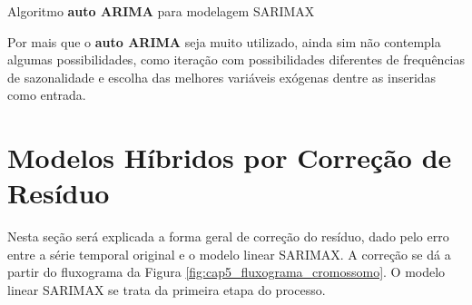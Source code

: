 \begin{algorithm}[!htbp]
    
\caption{Algoritmo \textbf{auto ARIMA} para modelagem SARIMAX \cite{hyndman2007automatic}}
\label{algo:auto_arima}
\end{algorithm}

Por mais que o \textbf{auto ARIMA} seja muito utilizado, ainda sim não contempla algumas possibilidades, como iteração com possibilidades diferentes de frequências de sazonalidade e escolha das melhores variáveis exógenas dentre as inseridas como entrada.

\section{Modelos Híbridos por Correção de Resíduo}

Nesta seção será explicada a forma geral de correção do resíduo, dado pelo erro entre a série temporal original e o modelo linear SARIMAX. A correção se dá a partir do fluxograma da Figura \ref{fig:cap5_fluxograma_cromossomo}. O modelo linear SARIMAX se trata da primeira etapa do processo.

